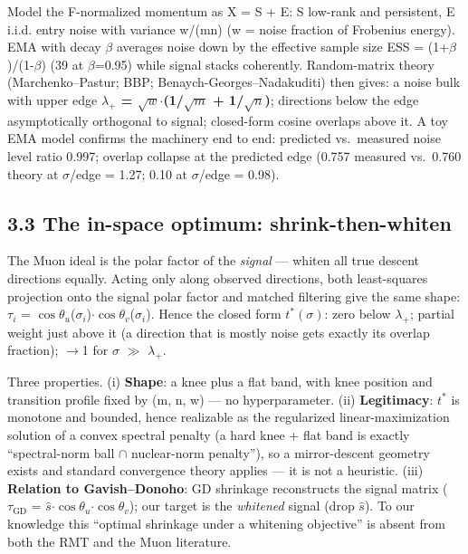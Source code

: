 \documentclass[
]{article}
\begin{document}
Model the F-normalized momentum as X = S + E: S low-rank and persistent,
E i.i.d. entry noise with variance w/(mn) (w = noise fraction of
Frobenius energy). EMA with decay \(\beta\) averages noise down by the
effective sample size ESS = (1+\(\beta\))/(1-\(\beta\)) (39 at
\(\beta\)=0.95) while signal stacks coherently. Random-matrix theory
(Marchenko--Pastur; BBP; Benaych-Georges--Nadakuditi) then gives: a
noise bulk with upper edge \textbf{\(\lambda_+\) =
\(\sqrt{w}\)\(\cdot\)(1/\(\sqrt{m}\) + 1/\(\sqrt{n}\))}; directions
below the edge asymptotically orthogonal to signal; closed-form cosine
overlaps above it. A toy EMA model confirms the machinery end to end:
predicted vs.~measured noise level ratio 0.997; overlap collapse at the
predicted edge (0.757 measured vs.~0.760 theory at \(\sigma\)/edge =
1.27; 0.10 at \(\sigma\)/edge = 0.98).

\subsection{3.3 The in-space optimum:
shrink-then-whiten}\label{the-in-space-optimum-shrink-then-whiten}

The Muon ideal is the polar factor of the \emph{signal} --- whiten all
true descent directions equally. Acting only along observed directions,
both least-squares projection onto the signal polar factor and matched
filtering give the same shape: \(\tau_i\) =
\(\cos\theta_u\)(\(\sigma_i\))\(\cdot\)\(\cos\theta_v\)(\(\sigma_i\)).
Hence the closed form \textbf{\(t^*(\sigma)\)}: zero below
\(\lambda_+\); partial weight just above it (a direction that is mostly
noise gets exactly its overlap fraction); \(\to\){}1 for \(\sigma\)
\(\gg\) \(\lambda_+\).

Three properties. (i) \textbf{Shape}: a knee plus a flat band, with knee
position and transition profile fixed by (m, n, w) --- no
hyperparameter. (ii) \textbf{Legitimacy}: \(t^*\) is monotone and
bounded, hence realizable as the regularized linear-maximization
solution of a convex spectral penalty (a hard knee + flat band is
exactly ``spectral-norm ball \(\cap\) nuclear-norm penalty''), so a
mirror-descent geometry exists and standard convergence theory applies
--- it is not a heuristic. (iii) \textbf{Relation to Gavish--Donoho}: GD
shrinkage reconstructs the signal matrix (\(\tau_{\mathrm{GD}}\) =
\(\hat{s}\)\(\cdot\)\(\cos\theta_u\)\(\cdot\)\(\cos\theta_v\)); our
target is the \emph{whitened} signal (drop \(\hat{s}\)). To our
knowledge this ``optimal shrinkage under a whitening objective'' is
absent from both the RMT and the Muon literature.
\end{document}
